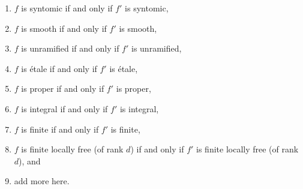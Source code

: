 \begin{lemma}
\begin{enumerate}
\label{item-universally-open}
\item $f$ is syntomic if and only if $f'$ is syntomic,
\label{item-syntomic}
\item $f$ is smooth if and only if $f'$ is smooth,
\label{item-smooth}
\item $f$ is unramified if and only if $f'$ is unramified,
\label{item-unramified}
\item $f$ is \'etale if and only if $f'$ is \'etale,
\label{item-etale}
\item $f$ is proper if and only if $f'$ is proper,
\label{item-proper}
\item $f$ is integral if and only if $f'$ is integral,
\label{item-integral}
\item $f$ is finite if and only if $f'$ is finite,
\label{item-finite}
\item
\label{item-finite-locally-free}
$f$ is finite locally free (of rank $d$) if and only if $f'$
is finite locally free (of rank $d$), and
\item add more here.
\end{enumerate}
\end{lemma}

